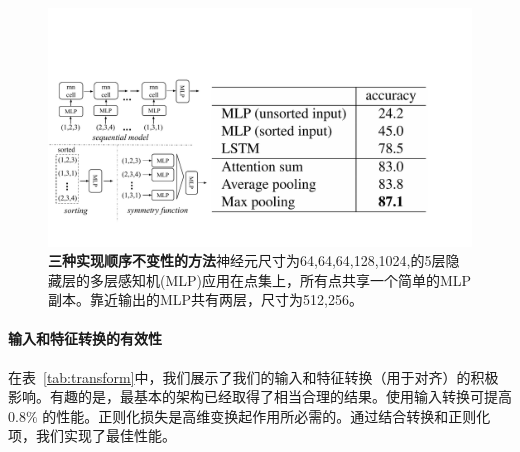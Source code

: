 
\begin{figure}[t!]
    \centering
    \includegraphics[width=\linewidth]{fig/order_invariant2.pdf}
    \caption{\textbf{三种实现顺序不变性的方法}神经元尺寸为64,64,64,128,1024,的5层隐藏层的多层感知机(MLP)应用在点集上，所有点共享一个简单的MLP副本。靠近输出的MLP共有两层，尺寸为512,256。}
    \label{fig:order_invariant}
\end{figure}

\paragraph{输入和特征转换的有效性} 在表~\ref{tab:transform}中，我们展示了我们的输入和特征转换（用于对齐）的积极影响。有趣的是，最基本的架构已经取得了相当合理的结果。使用输入转换可提高 $0.8\%$ 的性能。正则化损失是高维变换起作用所必需的。通过结合转换和正则化项，我们实现了最佳性能。

